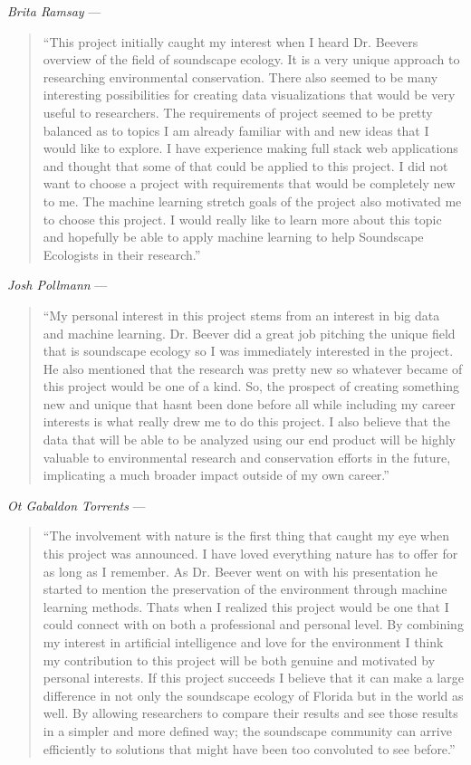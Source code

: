 \noindent\textit{Brita Ramsay} ---
\begin{quote}
``This project initially caught my interest when I heard Dr. Beever\textquotesingle s overview of the field of soundscape ecology. It is a very unique approach to researching environmental conservation. There also seemed to be many interesting possibilities for creating data visualizations that would be very useful to researchers. The requirements of project seemed to be pretty balanced as to topics I am already familiar with and new ideas that I would like to explore. I have experience making full stack web applications and thought that some of that could be applied to this project. I did not want to choose a project with requirements that would be completely new to me. The machine learning stretch goals of the project also motivated me to choose this project. I would really like to learn more about this topic and hopefully be able to apply machine learning to help Soundscape Ecologists in their research.''
\end{quote}
\newpage
\noindent\textit{Josh Pollmann} ---
\begin{quote}
``My personal interest in this project stems from an interest in big data and machine learning. Dr. Beever did a great job pitching the unique field that is soundscape ecology so I was immediately interested in the project. He also mentioned that the research was pretty new so whatever became of this project would be one of a kind. So, the prospect of creating something new and unique that hasn\textquotesingle t been done before all while including my career interests is what really drew me to do this project. I also believe that the data that will be able to be analyzed using our end product will be highly valuable to environmental research and conservation efforts in the future, implicating a much broader impact outside of my own career.''
\end{quote}

\noindent\textit{Ot Gabaldon Torrents} ---
\begin{quote}
``The involvement with nature is the first thing that caught my eye when this project was announced. I have loved everything nature has to offer for as long as I remember. As Dr. Beever went on with his presentation he started to mention the preservation of the environment through machine learning methods. That\textquotesingle s when I realized this project would be one that I could connect with on both a professional and personal level. By combining my interest in artificial intelligence and love for the environment I think my contribution to this project will be both genuine and motivated by personal interests. If this project succeeds I believe that it can make a large difference in not only the soundscape ecology of Florida but in the world as well. By allowing researchers to compare their results and see those results in a simpler and more defined way; the soundscape community can arrive efficiently to solutions that might have been too convoluted to see before.''
\end{quote}
